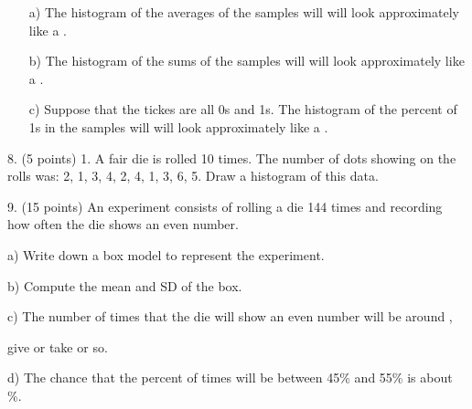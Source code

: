 \documentclass[10pt]{article}
\begin{document}
\begin{itemize}
\item[a)] The histogram of the averages of the samples will
  will look approximately like a \underbar{\hspace{1.2in}}.\vspace{.4in}
\item[b)] The histogram of the sums of the  samples will
  will look approximately like a \underbar{\hspace{1.2in}}.\vspace{.4in}
  
\item[c)] Suppose that the tickes are all 0s and 1s.  The histogram of the
  percent of 1s in the  samples will
  will look approximately like a \underbar{\hspace{1.2in}}.
\end{itemize}
\vspace{1in}

8. (5 points) 1. A fair die is rolled 10 times.  The number of dots showing on the rolls
was:  2, 1, 3, 4, 2, 4, 1, 3, 6, 5. 
Draw a histogram of this data.
\vspace{1.5in}

9.  (15 points) An experiment consists of rolling a die 144 times and recording how often
the die shows an even number.

\hspace{10pt} a) Write down a box model to represent the experiment.
\vspace{.5in}

\hspace{10pt} b) Compute the mean and SD of the box.
\vspace{1in}

\hspace{10pt} c) The number of times that the die will show an even number 
will be around \underline{\hspace{1in}},\vspace{10pt}

\hspace{10pt}\hphantom{e) }give or take \underline{\hspace{1in}} or so.  %
\vspace{.8in}

\hspace{10pt} d) The chance that the percent of times will be between 45\% and 55\% is about
\underline{\hspace{1in}} \%.  
\vfill
\eject
\end{document}
